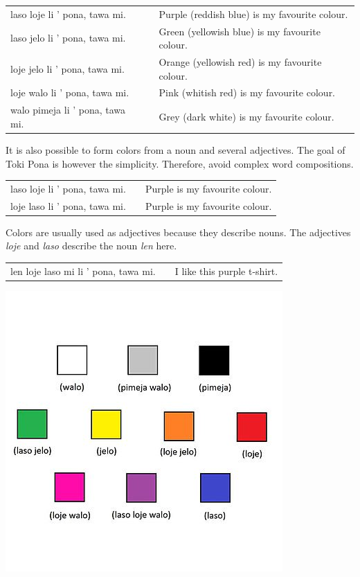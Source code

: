 \begin{supertabular}{p{5,5cm}|ll}
    laso loje li ' pona, tawa mi.   &  & Purple (reddish blue) is my favourite colour.  \\
    laso jelo li ' pona, tawa mi.   &  & Green (yellowish blue) is my favourite colour. \\
    loje jelo li ' pona, tawa mi.   &  & Orange (yellowish red) is my favourite colour. \\
    loje walo li ' pona, tawa mi.   &  & Pink (whitish red) is my favourite colour.     \\
    walo pimeja li ' pona, tawa mi. &  & Grey (dark white) is my favourite colour.      \\
\end{supertabular}

It is also possible to form colors from a noun and several adjectives.
The goal of Toki Pona is however the simplicity.
Therefore, avoid complex word compositions.

\begin{supertabular}{p{5,5cm}|ll}
    laso loje  li ' pona, tawa mi. &  & Purple is my favourite colour. \\
    loje laso  li ' pona, tawa mi. &  & Purple is my favourite colour. \\
\end{supertabular}

Colors are usually used as adjectives because they describe nouns.
The adjectives \textit{loje} and \textit{laso} describe the noun \textit{len} here.

\begin{supertabular}{p{5,5cm}|ll}
    len loje laso mi li ' pona, tawa mi. &  & I like this purple t-shirt. \\
\end{supertabular}

\includegraphics[scale=0.4]{colors}
